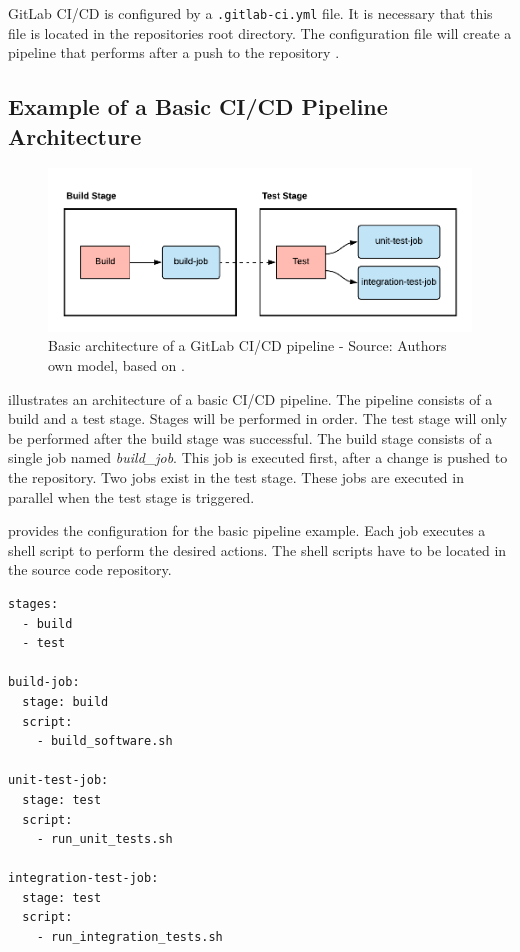 GitLab CI/CD is configured by a \texttt{.gitlab-ci.yml} file. It is necessary that this file is located in the repositories root directory.
The configuration file will create a pipeline that performs after a push to the repository \cite{Gitlab2020Docs}.


\subsection{Example of a Basic CI/CD Pipeline Architecture}

\begin{figure}[h]
\centering
\includegraphics[scale=0.8]{images/04_technical_background/gitlab/basic_pipeline}
\caption{Basic architecture of a GitLab CI/CD pipeline - Source: Authors own model, based on \cite{Gitlab2020Docs}.}
\label{fig:04_gitlab_pipeline_basic_arch}
\end{figure}

 illustrates an architecture of a basic CI/CD pipeline.
The pipeline consists of a build and a test stage. Stages will be performed in order. The test stage will only be performed after the build stage was successful.
The build stage consists of a single job named \textit{build\_job}. This job is executed first, after a change is pushed to the repository.
Two jobs exist in the test stage. These jobs are executed in parallel when the test stage is triggered.



 provides the configuration for the basic pipeline example.
Each job executes a shell script to perform the desired actions. The shell scripts have to be located in the source code repository.
\begin{lstlisting}[label=lst:04_gitlab_pipeline_basic_config-example, caption=Example of a \texttt{.gitlab-ci.yml} configuration file]
stages:
  - build
  - test

build-job:
  stage: build
  script:
    - build_software.sh

unit-test-job:
  stage: test
  script:
    - run_unit_tests.sh
    
integration-test-job:
  stage: test
  script:
    - run_integration_tests.sh
\end{lstlisting}



